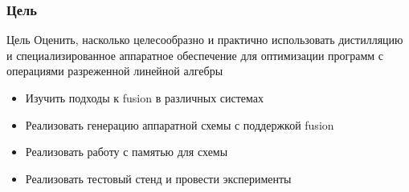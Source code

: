 \documentclass[xcolor=table,aspectratio=169]{beamer}
\begin{document}
\begin{frame}[fragile] \frametitle{Цель}
    
    \begin{block}{Цель}
    Оценить, насколько целесообразно и практично использовать дистилляцию и специализированное аппаратное обеспечение для оптимизации программ с операциями разреженной линейной алгебры

    \end{block}
    \begin{itemize}
    \vfill
        \item Изучить подходы к fusion в различных системах
        \vfill
        \item Реализовать генерацию аппаратной схемы с поддержкой fusion
        \vfill
        \item Реализовать работу с памятью для схемы
        \vfill
        \item Реализовать тестовый стенд и провести эксперименты
    \end{itemize}
      
\end{frame}
\end{document}
